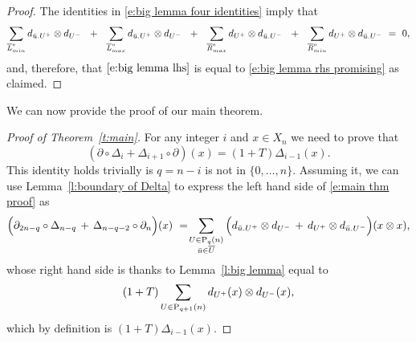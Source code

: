 \begin{proof}
	The identities in \eqref{e:big lemma four identities} imply that
	\begin{equation} \label{e:big lemma zero sum}
	\sum_{\overline{L}_{min}^{e}} d_{\bu.U^+} \otimes d_{U^-}\ \ +\ \
	\sum_{\overline{L}_{max}^{o}} d_{\bu.U^+} \otimes d_{U^-}\ \ +\ \
	\sum_{\overline{R}_{max}^{e}} d_{U^+} \otimes d_{\bu.U^-}\ \ +\ \ 
	\sum_{\overline{R}_{min}^{o}} d_{U^+} \otimes d_{\bu.U^-}\ =\ 0,
	\end{equation}
	and, therefore, that $\eqref{e:big lemma lhs}$ is equal to \eqref{e:big lemma rhs promising} as claimed.
\end{proof}

We can now provide the proof of our main theorem.

\begin{proof}[Proof of Theorem~\ref{t:main}]
	For any integer $i$ and $x \in X_n$ we need to prove that
	\begin{equation} \label{e:main thm proof}
	(\partial \circ \Delta_{i} + \Delta_{i+1} \circ \partial)(x) = (1 + T) \Delta_{i-1}(x).
	\end{equation}
	This identity holds trivially is $q = n-i$ is not in $\{0, \dots, n\}$.
	Assuming it, we can use Lemma~\ref{l:boundary of Delta} to express the left hand side of \eqref{e:main thm proof} as
	\begin{equation*}
	\Big( \partial_{2n-q} \circ \Delta_{n - q} \, +\, \Delta_{n-q-2} \circ \partial_n \Big) (x) \ = \! 
	\sum_{\substack{U \in \P_{q}(n) \\ \bu \in \overline{U}}} \Big( d_{\bu.U^+} \otimes d_{U^-} \, + \, d_{U^+} \otimes d_{\bu.U^-} \Big) (x \otimes x),
	\end{equation*}
	whose right hand side is thanks to Lemma~\ref{l:big lemma} equal to
	\begin{equation*}
	(1+T) \sum_{U \in \P_{q+1}(n)} d_{U^+}(x) \otimes d_{U^-}(x),
	\end{equation*}
	which by definition is $(1+T)\Delta_{i-1}(x)$.
\end{proof}